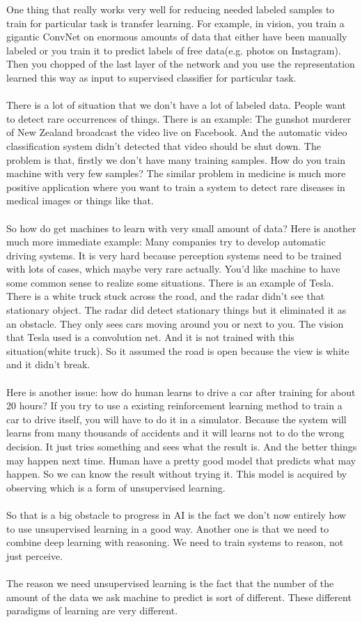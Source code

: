 \documentclass{article}
\begin{document}
One thing that really works very well for reducing needed labeled samples to train for particular task is transfer learning. For example, in vision, you train a gigantic ConvNet on enormous amounts of data that either have been manually labeled or you train it to predict labels of free data(e.g. photos on Instagram). Then you chopped of the last layer of the network and you use the representation learned this way as input to supervised classifier for particular task. \\ \\

There is a lot of situation that we don't have a lot of labeled data. People want to detect rare occurrences of things. There is an example: The gunshot murderer of New Zealand broadcast the video live on Facebook. And the automatic video classification system didn't detected that video should be shut down. The problem is that, firstly we don't have many training samples. How do you train machine with very few samples? The similar problem in medicine is much more positive application where you want to train a system to detect rare diseases in medical images or things like that.\\ \\

So how do get machines to learn with very small amount of data? Here is another much more immediate example: Many companies try to develop automatic driving systems. It is very hard because perception systems need to be trained with lots of cases, which maybe very rare actually. You'd like machine to have some common sense to realize some situations. There is an example of Tesla. There is a white truck stuck across the road, and the radar didn't see that stationary object. The radar did detect stationary things but it eliminated it as an obstacle. They only sees cars moving around you or next to you. The vision that Tesla used is a convolution net. And it is not trained with this situation(white truck). So it assumed the road is open because the view is white and it didn't break.\\ \\

Here is another issue: how do human learns to drive a car after training for about 20 hours? If you try to use a existing reinforcement learning method to train a car to drive itself, you will have to do it in a simulator. Because the system will learns from many thousands of accidents and it will learns not to do the wrong decision. It just tries something and sees what the result is. And the better things may happen next time. Human have a pretty good model that predicts what may happen. So we can know the result without trying it. This model is acquired by observing which is a form of unsupervised learning.\\ \\
So that is a big obstacle to progress in AI is the fact we don't now entirely how to use unsupervised learning in a good way. Another one is that we need to combine deep learning with reasoning. We need to train systems to reason, not just perceive. \\ \\

The reason we need unsupervised learning is the fact that the number of the amount of the data we ask machine to predict is sort of different. These different paradigms of learning are very different. \\ \\
\end{document}
